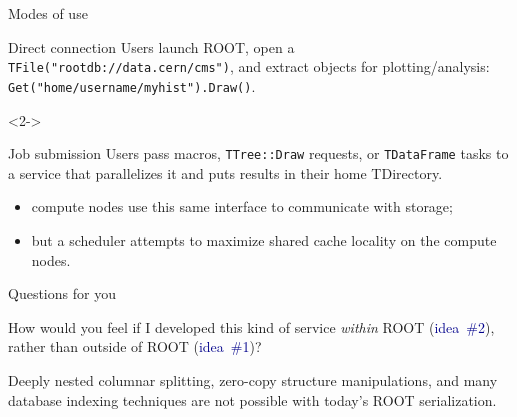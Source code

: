 \documentclass[aspectratio=169]{beamer}
\begin{document}
\begin{frame}{Modes of use}
\vspace{0.5 cm}
\begin{block}{Direct connection}
Users launch ROOT, open a {\tt TFile("rootdb://data.cern/cms")}, and extract objects for plotting/analysis: {\tt Get("home/username/myhist").Draw()}.
\end{block}

\vspace{0.5 cm}
\begin{uncoverenv}<2->
\begin{block}{Job submission}
Users pass macros, {\tt TTree::Draw} requests, or {\tt TDataFrame} tasks to a service that parallelizes it and puts results in their home TDirectory.

\begin{itemize}
\item<3-> compute nodes use this same interface to communicate with storage;
\item<4-> but a scheduler attempts to maximize shared cache locality on the compute nodes.
\end{itemize}
\end{block}
\end{uncoverenv}

\vspace{0.25 cm}
\begin{center}
\large {}
\end{center}
\end{frame}

\begin{frame}{Questions for you}
\vspace{0.5 cm}
\begin{description}\setlength{\itemsep}{0.5 cm}
\item[Question:] How would you feel if I developed this kind of service {\it within} ROOT (\textcolor{darkblue}{idea~\#2}), rather than outside of ROOT (\textcolor{darkblue}{idea~\#1})?

\vspace{0.25 cm}

\item[Question:]<3-> Deeply nested columnar splitting, zero-copy structure manipulations, and many database indexing techniques are not possible with today's ROOT serialization.

\vspace{0.25 cm}

\vspace{0.25 cm}
\end{description}
\end{frame}
\end{document}
